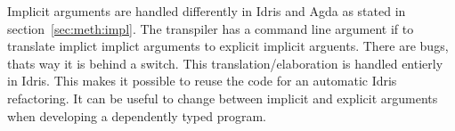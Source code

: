 

Implicit arguments are handled differently in Idris and Agda as
stated in section~\ref{sec:meth:impl}. The transpiler has a command line
argument if to translate implict implict arguments to explicit implicit
arguents. There are bugs, thats way it is behind a switch. This
translation/elaboration is handled entierly in Idris. This makes it possible to
reuse the code for an automatic Idris refactoring.  It can be useful to change
between implicit and explicit arguments when developing a dependently typed
program.






